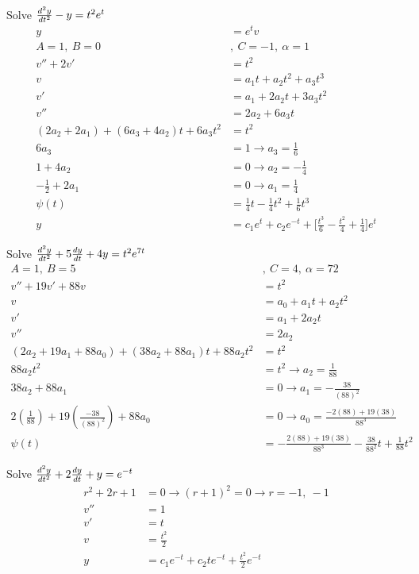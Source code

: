 \documentclass[12pt]{article}
\begin{document}
\begin{example} Solve $\frac{d^2y}{dt^2} - y = t^2e^t$ $$\begin{aligned} y &= e^tv \\ A = 1, ~ B = 0 &, ~C = -1, ~\alpha = 1 \\ v'' + 2v'  &= t^2 \\ v &= a_1t + a_2t^2 + a_3t^3 \\ v' &= a_1 + 2a_2t + 3a_3t^2 \\ v'' &= 2a_2 + 6a_3t \\ (2a_2 + 2a_1) + (6a_3 + 4a_2)t + 6a_3t^2 &= t^2 \\ 6a_3 &= 1 \to a_3 = \frac{1}{6} \\ 1 + 4a_2 &= 0 \to a_2 = -\frac{1}{4} \\ -\frac{1}{2} + 2a_1 &= 0 \to a_1 = \frac{1}{4} \\ \psi(t) &= \frac{1}{4}t - \frac{1}{4}t^2 + \frac{1}{6}t^3 \\ y &= c_1e^t + c_2e^{-t} + \Big[\frac{t^3}{6} - \frac{t^2}{4} + \frac{1}{4}\Big]e^t \end{aligned} $$ \end{example} 

\begin{example} Solve $\frac{d^2y}{dt^2} + 5\frac{dy}{dt} + 4y = t^2e^{7t}$ $$\begin{aligned} A = 1, ~ B = 5 &, ~C = 4, ~\alpha = 72 \\ v'' + 19v' + 88v &= t^2 \\ v &= a_0 + a_1t + a_2t^2 \\ v' &= a_1 + 2a_2t \\ v'' &= 2a_2 \\ (2a_2 + 19a_1 + 88a_0) + (38a_2 + 88a_1)t + 88a_2t^2 &= t^2 \\ 88a_2t^2 &= t^2 \to a_2 = \frac{1}{88} \\ 38a_2 + 88a_1 &= 0 \to a_1 = -\frac{38}{(88)^2} \\ 2(\frac{1}{88}) + 19(\frac{-38}{(88)^2}) + 88a_0 &= 0 \to a_0 = \frac{-2(88) + 19(38)}{88^3} \\ \psi(t) &= -\frac{2(88) + 19(38)}{88^3} - \frac{38}{88^2}t + \frac{1}{88}t^2 \end{aligned} $$ \end{example} 

\begin{example} Solve $\frac{d^2y}{dt^2} + 2\frac{dy}{dt} + y = e^{-t}$ $$\begin{aligned} r^2 + 2r + 1 &= 0 \to (r + 1)^2 = 0 \to r = -1,~ -1 \\ 
v'' &= 1 \\ v' &= t \\ v &= \frac{t^2}{2} \\ y &= c_1e^{-t} + c_2te^{-t} + \frac{t^2}{2}e^{-t} \end{aligned} $$ \end{example} 
\end{document}
